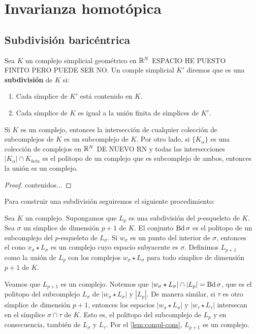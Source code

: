 
\chapter{Invarianza homotópica}
\section{Subdivisión baricéntrica}

\begin{definicion}
	Sea $K$ un complejo simplicial geométrico en $\mathbb{R}^N$ ESPACIO HE PUESTO FINITO PERO PUEDE SER NO. Un comple simplicial $K'$ diremos que es una \textbf{subdivisión} de $K$ si:
	\begin{enumerate}
		\item Cada símplice de $K'$ está contenido en $K$.
		\item Cada símplice de $K$ es igual a la unión finita de símplices de $K'$.
	\end{enumerate} 
\end{definicion}
\begin{lema}
	\label{lem:compl-cons}
	Si $K$ es un complejo, entonces la intersección de cualquier colección de subcomplejos de $K$ es un subcomplejo de $K$. Por otro lado, si $\{K_{\alpha}\}$ es una colección de complejos en $\mathbb{R}^N$ DE NUEVO RN y todas las intersecciones $|K_{\alpha}| \cap K_{beta}$ es el politopo de un complejo que es subcomplejo de ambos, entonces la unión es un complejo.
\end{lema}
\begin{proof}
	contenidos...
\end{proof}
Para construir una subdivisión seguiremos el siguiente procedimiento:

Sea $K$ un complejo. Supongamos que $L_p$ es una subdivisión del $p$-esqueleto de $K$. Sea $\sigma$ un símplice de dimensión $p+1$ de $K$. El conjunto $\operatorname{Bd} \sigma$ es el politopo de un subcomplejo del $p$-esqueleto de $L_{\sigma}$. Si $w_{\sigma}$ es un punto del interior de $\sigma$, entonces el cono $x_\sigma \star L_{\sigma}$ es un complejo cuyo espacio subyacente es $\sigma$. Definimos $L_{p+1}$ como la unión de $L_p$ con los complejos $w_{\sigma} \star L_{\sigma}$ para todo símplice de dimensión $p+1$ de $K$.

Veamos que $L_{p+1}$ es un complejo. Notemos que $|w_{\sigma} \star L_{\sigma}|\cap|L_p| = \operatorname{Bd} \sigma$, que es el politopo del subcomplejo $L_{\sigma}$ de $|w_{\sigma} \star L_{\sigma}|$ y $|L_p|$. De manera similar, si $\tau$ es otro símplice de dimensión $p+1$, entonces los espacios $|w_{\sigma} \star L_{\sigma}|$ y $|w_{\tau} \star L_{\tau}|$ intersecan en el símplice $\sigma \cap \tau$ de $K$. Esto es, el politopo del subcomplejo de $L_p$ y en consecuencia, también de $L_{\sigma}$ y $L_{\tau}$. Por el \autoref{lem:compl-cons}, $L_{p+1}$ es un complejo.
 
